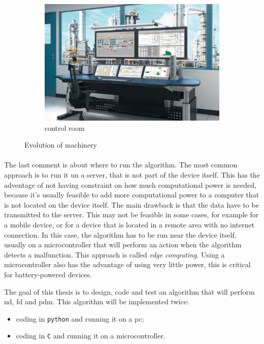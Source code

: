 \begin{figure}[htbp]
\begin{subfigure}{0.3\textwidth}
        \includegraphics[width=\textwidth]{images/control-rooms-workstations.jpg}
        \caption{control room \cite{evosite}}
        \label{fig:controlroom}
    \end{subfigure}
    \caption{Evolution of machinery}
    \label{fig:machineryevolution}
\end{figure}

\paragraph*{}
The last comment is about where to run the algorithm. The most common approach is to run it un a server, that is not part of the device itself. This has the adventage of not having constraint on how much computational power is needed, because it's usually feasible to add more computational power to a computer that is not located on the device itself. The main drawback is that the data have to be transmitted to the server. This may not be feasible in some cases, for example for a mobile device, or for a device that is located in a remote area with no internet connection. In this case, the algorithm has to be run near the device itself, usually on a microcontroller that will perform an action when the algorithm detects a malfunction. This approach is called \emph{edge computing}. Using a microcontroller also has the advantage of using very little power, this is critical for battery-powered devices.

The goal of this thesis is to design, code and test an algorithm that will perform \gls{nd}, \gls{fd} and \gls{pdm}. This algorithm will be implemented twice:
\begin{itemize}
    \item  coding in \texttt{python} and running it on a \gls{pc};
    \item   coding in \texttt{C} and running it on a microcontroller.
\end{itemize}
